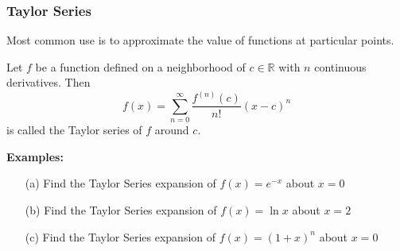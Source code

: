 \documentclass{beamer}
\begin{document}
\begin{frame}
\frametitle{Taylor Series}
Most common use is to approximate the value of functions at particular points.
\begin{theorem}
	Let $f$ be a function defined on a neighborhood of $c \in \mathbb{R}$ with $n$ continuous derivatives. Then
	$$f(x) = \sum_{n=0}^{\infty} \frac{f^{(n)}(c)}{n!} (x-c)^n$$
	is called the Taylor series of $f$ around $c$.
\end{theorem}

\vspace{6pt}
\textbf{Examples:}
\begin{itemize}
	\item[(a)] Find the Taylor Series expansion of $f(x) = e^{-x}$ about $x=0$
	\item[(b)] Find the Taylor Series expansion of $f(x) = \ln x$ about $x=2$
	\item[(c)] Find the Taylor Series expansion of $f(x) = (1+x)^n$ about $x=0$
\end{itemize}
\end{frame}


%		
%		
%
%
%
%
\end{document}
